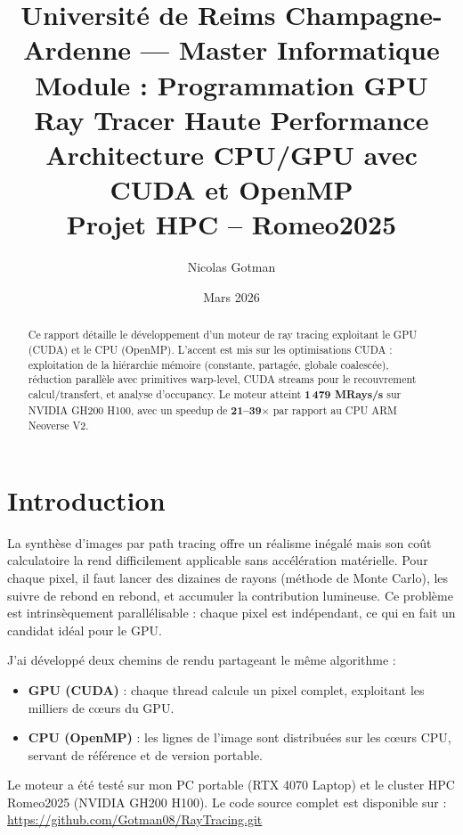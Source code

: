 \documentclass[12pt,a4paper]{article}
\title{
    \vspace{-1cm}
    {\normalsize Université de Reims Champagne-Ardenne --- Master Informatique}\\[0.1cm]
    {\normalsize Module : Programmation GPU}\\[0.4cm]
    \textbf{Ray Tracer Haute Performance}\\[0.3cm]
    \large Architecture CPU/GPU avec CUDA et OpenMP\\[0.2cm]
    \normalsize Projet HPC -- Romeo2025
}
\author{Nicolas Gotman}
\date{Mars 2026}
\begin{document}
\maketitle
\thispagestyle{empty}

\vspace{0.5cm}
\begin{abstract}
Ce rapport détaille le développement d'un moteur de ray tracing exploitant le GPU (CUDA) et le CPU (OpenMP). L'accent est mis sur les optimisations CUDA : exploitation de la hiérarchie mémoire (constante, partagée, globale coalescée), réduction parallèle avec primitives warp-level, CUDA streams pour le recouvrement calcul/transfert, et analyse d'occupancy. Le moteur atteint \textbf{1\,479 MRays/s} sur NVIDIA GH200 H100, avec un speedup de \textbf{21--39$\times$} par rapport au CPU ARM Neoverse V2.
\end{abstract}

\tableofcontents
\vspace{0.5cm}

\section{Introduction}

La synthèse d'images par path tracing offre un réalisme inégalé mais son coût calculatoire la rend difficilement applicable sans accélération matérielle. Pour chaque pixel, il faut lancer des dizaines de rayons (méthode de Monte Carlo), les suivre de rebond en rebond, et accumuler la contribution lumineuse. Ce problème est intrinsèquement parallélisable : chaque pixel est indépendant, ce qui en fait un candidat idéal pour le GPU.

J'ai développé deux chemins de rendu partageant le même algorithme :
\begin{itemize}
    \item \textbf{GPU (CUDA)} : chaque thread calcule un pixel complet, exploitant les milliers de cœurs du GPU.
    \item \textbf{CPU (OpenMP)} : les lignes de l'image sont distribuées sur les cœurs CPU, servant de référence et de version portable.
\end{itemize}

Le moteur a été testé sur mon PC portable (RTX 4070 Laptop) et le cluster HPC Romeo2025 (NVIDIA GH200 H100). Le code source complet est disponible sur : \url{https://github.com/Gotman08/RayTracing.git}
\end{document}

